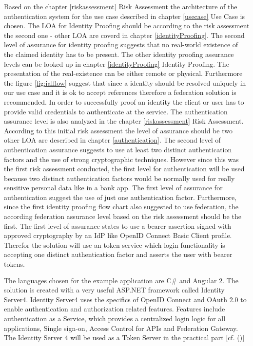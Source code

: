 Based on the chapter \ref{riskassessment} Risk Assessment the architecture of the authentication system for the use case described in chapter \ref{usecase} Use Case is chosen. The LOA for Identity Proofing should be according to the risk assessment the second one - other LOA are coverd in chapter \ref{identityProofing}. The second level of assurance for identity proofing suggests that no real-world existence of the claimed identity has to be present. The other identity proofing assurance levels can be looked up in chapter \ref{identityProofing} Identity Proofing. The presentation of the real-existence can be either remote or physical. Furthermore the figure \ref{fig:ialflow} suggest that since a identity should be resolved uniquely in our use case and it is ok to accept references therefore a federation solution is recommended. In order to successfully proof an identity the client or user has to provide valid credentials to authenticate at the service. The  authentication assurance level is also analyzed in the chapter \ref{riskassessment} Risk Assessment. According to this initial risk assessment the level of assurance should be two other LOA are described in chapter \ref{authentication}. The second level of authentication assurance suggests to use at least two distinct authentication factors and the use of strong cryptographic techniques. However since this was the first risk assessment conducted, the first level for authentication will be used because two distinct authentication factors would be normally used for really sensitive personal data like in a bank app. The first level of assurance for authentication suggest the use of just one authentication factor. Furthermore, since the first identity proofing flow chart also suggested to use federation, the according federation assurance level based on the risk assessment should be the first. The first level of assurance states to use a bearer assertion signed with approved cryptography by an IdP like OpenID Connect Basic Client profile. Therefor the solution will use an token service which login functionality is  accepting one distinct authentication factor and asserts the user with bearer tokens. 


The languages chosen for the example application are C\# and Angular 2. The solution is created with a very useful ASP.NET framework called Identity Server4. Identity Server4 uses the specifics of OpenID Connect and OAuth 2.0 to enable authentication and authorization related features. Features include authentication as a Service, which provides a centralized login logic for all applications, Single sign-on, Access Control for APIs and Federation Gateway. The Identity Server 4 will be used as a Token Server in the practical part [cf. (\cite{Brock:2018:ID4})]

